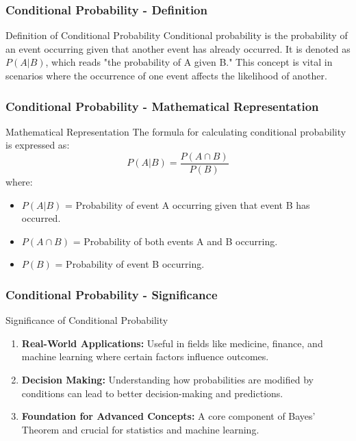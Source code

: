 \documentclass[aspectratio=169]{beamer}
\begin{document}
\begin{frame}[fragile]
    \frametitle{Conditional Probability - Definition}
    \begin{block}{Definition of Conditional Probability}
        Conditional probability is the probability of an event occurring given that another event has already occurred. 
        It is denoted as \( P(A|B) \), which reads "the probability of A given B." 
        This concept is vital in scenarios where the occurrence of one event affects the likelihood of another.
    \end{block}
\end{frame}

\begin{frame}[fragile]
    \frametitle{Conditional Probability - Mathematical Representation}
    \begin{block}{Mathematical Representation}
        The formula for calculating conditional probability is expressed as:
        \begin{equation}
            P(A|B) = \frac{P(A \cap B)}{P(B)} 
        \end{equation}
        where:
        \begin{itemize}
            \item \( P(A|B) \) = Probability of event A occurring given that event B has occurred.
            \item \( P(A \cap B) \) = Probability of both events A and B occurring.
            \item \( P(B) \) = Probability of event B occurring.
        \end{itemize}
    \end{block}
\end{frame}

\begin{frame}[fragile]
    \frametitle{Conditional Probability - Significance}
    \begin{block}{Significance of Conditional Probability}
        \begin{enumerate}
            \item \textbf{Real-World Applications:} Useful in fields like medicine, finance, and machine learning where certain factors influence outcomes.
            \item \textbf{Decision Making:} Understanding how probabilities are modified by conditions can lead to better decision-making and predictions.
            \item \textbf{Foundation for Advanced Concepts:} A core component of Bayes’ Theorem and crucial for statistics and machine learning.
        \end{enumerate}
    \end{block}
\end{frame}
\end{document}
